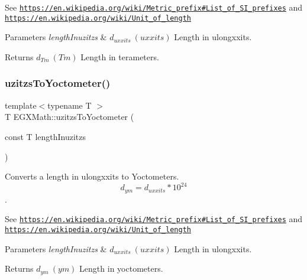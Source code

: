 See \href{https://en.wikipedia.org/wiki/Metric_prefix#List_of_SI_prefixes}{\tt https\+://en.\+wikipedia.\+org/wiki/\+Metric\+\_\+prefix\#\+List\+\_\+of\+\_\+\+S\+I\+\_\+prefixes} and \href{https://en.wikipedia.org/wiki/Unit_of_length}{\tt https\+://en.\+wikipedia.\+org/wiki/\+Unit\+\_\+of\+\_\+length} 
\begin{DoxyParams}{Parameters}
{\em length\+Inuzitzs} & $ d_{uxxits}\ (uxxits)$ Length in ulongxxits. \\
\hline
\end{DoxyParams}
\begin{DoxyReturn}{Returns}
$ d_{Tm}\ (Tm)$ Length in terameters. 
\end{DoxyReturn}
\mbox{\label{group___e_g_x_math-_conversions-_length_conversions-uzitzs-_s_i_gae0faf7639d852bfde8863b3615aa096a}} 
\subsubsection{\texorpdfstring{uzitzs\+To\+Yoctometer()}{uzitzsToYoctometer()}}
{\footnotesize\ttfamily template$<$typename T $>$ \\
T E\+G\+X\+Math\+::uzitzs\+To\+Yoctometer (\begin{DoxyParamCaption}\item[{const T}]{length\+Inuzitzs }\end{DoxyParamCaption})}



Converts a length in ulongxxits to Yoctometers. \[ d_{ym}=d_{uxxits} * 10^{24} \]. 

See \href{https://en.wikipedia.org/wiki/Metric_prefix#List_of_SI_prefixes}{\tt https\+://en.\+wikipedia.\+org/wiki/\+Metric\+\_\+prefix\#\+List\+\_\+of\+\_\+\+S\+I\+\_\+prefixes} and \href{https://en.wikipedia.org/wiki/Unit_of_length}{\tt https\+://en.\+wikipedia.\+org/wiki/\+Unit\+\_\+of\+\_\+length} 
\begin{DoxyParams}{Parameters}
{\em length\+Inuzitzs} & $ d_{uxxits}\ (uxxits)$ Length in ulongxxits. \\
\hline
\end{DoxyParams}
\begin{DoxyReturn}{Returns}
$ d_{ym}\ (ym)$ Length in yoctometers. 
\end{DoxyReturn}
\mbox{\label{group___e_g_x_math-_conversions-_length_conversions-uzitzs-_s_i_gac20be4db1eed0397d7925d5b7148dd94}} 
